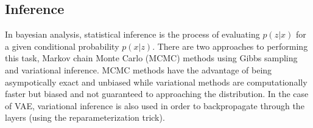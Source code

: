 

\subsection{Inference}
\label{sub:vae_inference}
In bayesian analysis, statistical inference is the process of evaluating $p(z|x)$ for a given conditional probability $p(x|z)$.
There are two approaches to performing this task, Markov chain Monte Carlo (MCMC) methods using Gibbs sampling and variational inference.
MCMC methods have the advantage of being asympotically exact and unbiased while variational methods are computationally faster but biased and not guaranteed to approaching the distribution.
In the case of VAE, variational inference is also used in order to backpropagate through the layers (using the reparameterization trick).


